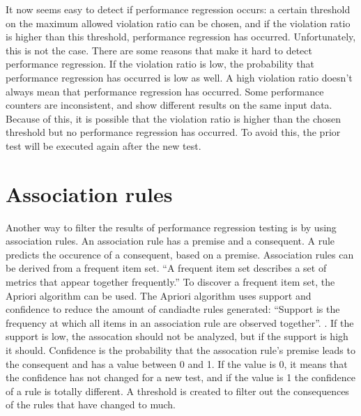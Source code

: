 It now seems easy to detect if performance regression occurs: a certain threshold on the maximum allowed violation ratio can be chosen, and if the violation ratio is higher than this threshold, performance regression has occurred. Unfortunately, this is not the case. There are some reasons that make it hard to detect performance regression. If the violation ratio is low, the probability that performance regression has occurred is low as well. A high violation ratio doesn't always mean that performance regression has occurred. Some performance counters are inconsistent, and show different results on the same input data. Because of this, it is possible that the violation ratio is higher than the chosen threshold but no performance regression has occurred. To avoid this, the prior test will be executed again after the new test.

\section{Association rules}
Another way to filter the results of performance regression testing is by using association rules. An association rule has a premise and a consequent. A rule predicts the occurence of a consequent, based on a premise. Association rules can be derived from a frequent item set. ``A frequent item set describes a set of metrics that appear together frequently.''\cite{foo2010mining} To discover a frequent item set, the Apriori algorithm can be used. The Apriori algorithm uses support and confidence to reduce the amount of candiadte rules generated:
``Support is the frequency at which all items in an association rule are observed together''. \cite{foo2010mining}. If the support is low, the assocation should not be analyzed, but if the support is high it should. Confidence is the probability that the assocation rule's premise leads to the consequent and has a value between 0 and 1. If the value is 0, it means that the confidence has not changed for a new test, and if the value is 1 the confidence of a rule is totally different. A threshold is created to filter out the consequences of the rules that have changed to much.






